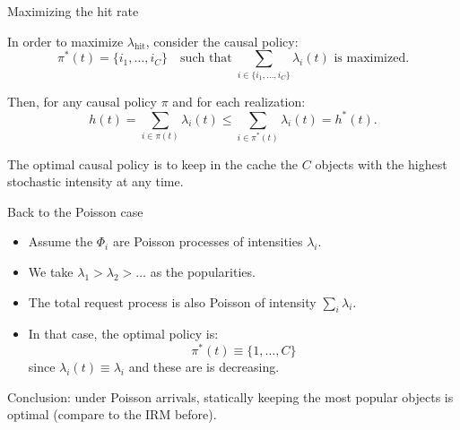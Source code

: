\documentclass[aspectratio=169]{beamer}
\newenvironment*{myitem}[1][1.5em]{\begin{itemize}\setlength{\itemsep}{#1}}{\end{itemize}}
\begin{document}
\begin{frame}{Maximizing the hit rate}
	
	In order to maximize $\lambda_{\text{hit}}$, consider the causal policy:
	\begin{equation*}
		\pi^*(t) = \{i_1,\ldots,i_C\} \quad \text{such that}\; \sum_{i\in\{i_1,\ldots,i_C\}} \lambda_{i}(t) \text{ is maximized.}
	\end{equation*}

	Then, for any causal policy $\pi$ and for each realization:
	\begin{equation*}
		h(t) = \sum_{i\in\pi(t)} \lambda_i(t) \leqslant \sum_{i\in \pi^*(t)} \lambda_i(t) = h^*(t).
	\end{equation*} 

	\begin{theorem}
		The \alert{optimal causal policy} is to keep in the cache the $C$ objects with the \alert{highest stochastic intensity} at any time.
	\end{theorem}

\end{frame}

\begin{frame}{Back to the Poisson case}

	\begin{myitem}
		\item Assume the $\Phi_i$ are Poisson processes of intensities $\lambda_i$.
		\item We take $\lambda_1>\lambda_2>\ldots$ as the popularities.
		\item The total request process is also Poisson of intensity $\sum_i\lambda_i$.
		\item In that case, the optimal policy is:
		\begin{equation*}
			\pi^*(t) \equiv \{1,\ldots,C\}
		\end{equation*}
		since $\lambda_i(t)\equiv \lambda_i$ and these are is decreasing.
	\end{myitem}

	\pause \vfill
	\alert{Conclusion:} under Poisson arrivals, statically keeping the most popular objects is optimal (compare to the IRM before).
\end{frame}
\end{document}
